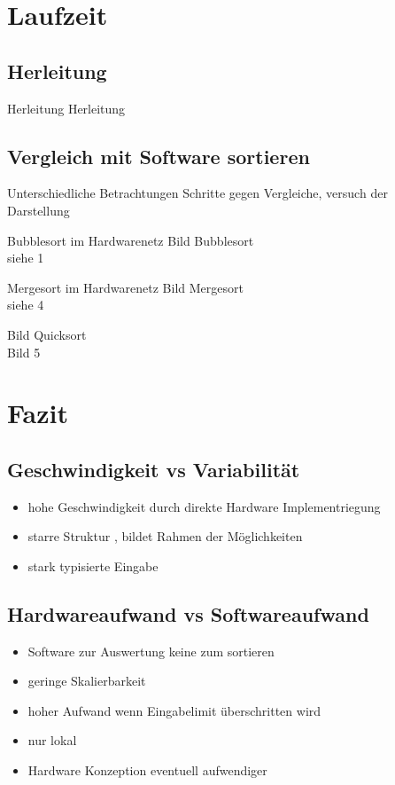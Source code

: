 \documentclass[ucs,9pt]{beamer}
\begin{document}
\section{Laufzeit}
\subsection{Herleitung}
\begin{frame}{Herleitung}
Herleitung
\end{frame}
\subsection{Vergleich mit Software sortieren}
\begin{frame}
Unterschiedliche Betrachtungen Schritte gegen Vergleiche, versuch der
Darstellung
\end{frame}
\begin{frame}{Bubblesort im Hardwarenetz}
Bild Bubblesort \\
siehe 1 
\end{frame}
\begin{frame}{Mergesort im Hardwarenetz}
Bild Mergesort \\
siehe 4 
\end{frame}
\begin{frame}
Bild Quicksort \\
Bild 5
\end{frame}
\section{Fazit}
\subsection{Geschwindigkeit vs Variabilität}
\begin{frame}
\begin{itemize}
\item hohe Geschwindigkeit durch direkte Hardware Implementriegung
\item starre Struktur , bildet Rahmen der Möglichkeiten
\item stark typisierte Eingabe
\end{itemize}
\end{frame}
\subsection{Hardwareaufwand vs Softwareaufwand}
\begin{frame}
\begin{itemize}
  \item Software zur Auswertung keine zum sortieren
  \item geringe Skalierbarkeit
  \item hoher Aufwand wenn Eingabelimit überschritten wird
  \item nur lokal
  \item Hardware Konzeption eventuell aufwendiger
\end{itemize}
\end{frame}
\end{document}
